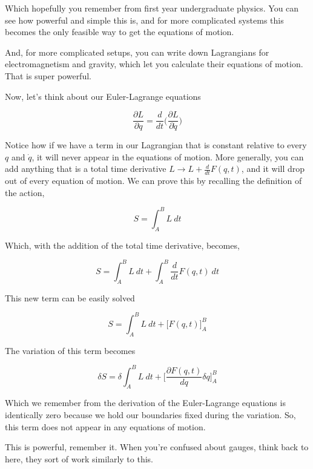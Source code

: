 \documentclass{article}
\begin{document}
Which hopefully you remember from first year undergraduate physics. You can see how powerful and simple this is, and for more complicated systems this becomes the only feasible way to get the equations of motion.

And, for more complicated setups, you can write down Lagrangians for electromagnetism and gravity, which let you calculate their equations of motion. That is super powerful.

Now, let's think about our Euler-Lagrange equations

\begin{equation}
    \frac{\partial L}{\partial q} = \frac{d}{dt}\biggl(\frac{\partial L}{\partial \dot{q}}\biggr)
\end{equation}

Notice how if we have a term in our Lagrangian that is constant relative to every $q$ and $\dot{q}$, it will never appear in the equations of motion. More generally, you can add anything that is a total time derivative $L \rightarrow L + \frac{d}{dt}F(q,t)$, and it will drop out of every equation of motion. We can prove this by recalling the definition of the action,

\begin{equation}
    S = \int_A^BL~dt
\end{equation}

Which, with the addition of the total time derivative, becomes,

\begin{equation}
    S = \int_A^BL~dt + \int_A^B\frac{d}{dt}F(q,t)~dt
\end{equation}

This new term can be easily solved

\begin{equation}
    S = \int_A^BL~dt + \biggl[F(q,t)\biggr]_A^B
\end{equation}

The variation of this term becomes

\begin{equation}
    \delta S = \delta \int_A^BL~dt + \biggl[\frac{\partial F(q,t)}{dq}\delta q\biggr]_A^B
\end{equation}

Which we remember from the derivation of the Euler-Lagrange equations is identically zero because we hold our boundaries fixed during the variation. So, this term does not appear in any equations of motion.

This is powerful, remember it. When you're confused about gauges, think back to here, they sort of work similarly to this.
\end{document}
